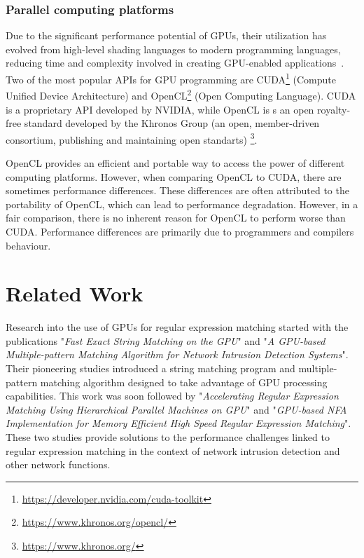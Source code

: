 \documentclass[10pt,onecolumn,twoside,english,a4paper]{article}
\begin{document}
\subsubsection{Parallel computing platforms} \label{Parallel computing platforms}
Due to the significant performance potential of GPUs, their  utilization has evolved from high-level shading languages to modern programming languages, reducing time and complexity involved in creating GPU-enabled applications~\cite{Asaduzzaman:Impact_CUDA_OpenCL}.
Two of the most popular APIs for GPU programming are CUDA\footnote{\url{https://developer.nvidia.com/cuda-toolkit}} (Compute Unified Device Architecture) and OpenCL\footnote{\url{https://www.khronos.org/opencl/}} (Open Computing Language). CUDA is a proprietary API developed by NVIDIA, while OpenCL is s an open royalty-free standard developed by the Khronos Group (an open, member-driven consortium, publishing and maintaining open standarts) \footnote{\url{https://www.khronos.org/}}.

OpenCL provides an efficient and portable way to access the power of different computing platforms. However, when comparing OpenCL to CUDA, there are sometimes performance differences. These differences are often attributed to the portability of OpenCL, which can lead to performance degradation. However, in a fair comparison, there is no inherent reason for OpenCL to perform worse than CUDA. Performance differences are primarily due to programmers and compilers behaviour\cite{Fang:Comparison-cuda-opencl}.

\section{Related Work} \label{Related work}
Research into the use of GPUs for regular expression matching started with the publications "\textit{Fast Exact String Matching on the GPU}"\cite{schatz2007fast} and "\textit{A GPU-based Multiple-pattern Matching Algorithm for Network Intrusion
  Detection Systems}"\cite{huang2008gpu}. Their pioneering studies introduced a string matching program and multiple-pattern matching algorithm designed to take advantage of GPU processing capabilities.
This work was soon followed by "\textit{Accelerating Regular Expression Matching Using Hierarchical Parallel Machines on GPU}"\cite{Lin:regex_gpu_parallel} and "\textit{GPU-based NFA Implementation for Memory Efficient High Speed Regular Expression Matching}"\cite{Zu:GPU-NFA}. These two studies provide solutions to the performance challenges linked to regular expression matching in the context of network intrusion detection and other network functions.
\end{document}
